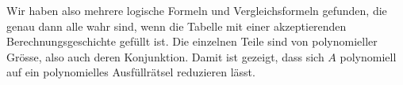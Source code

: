 Wir haben also mehrere logische Formeln und Vergleichsformeln
gefunden, die genau dann alle wahr sind, wenn die Tabelle mit einer
akzeptierenden Berechnungsgeschichte gefüllt ist.
Die einzelnen Teile sind von polynomieller Grösse, also auch deren
Konjunktion.
Damit ist gezeigt, dass sich $A$ polynomiell auf ein polynomielles
Ausfüllrätsel reduzieren lässt.


